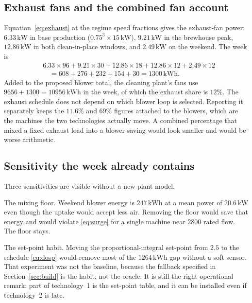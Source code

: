 \subsection{Exhaust fans and the combined fan account}

Equation~\eqref{eq:exhaust} at the regime speed fractions gives the exhaust-fan power: $6.33\,\mathrm{kW}$ in base production ($0.75^{3}\times 15\,\mathrm{kW}$), $9.21\,\mathrm{kW}$ in the brewhouse peak, $12.86\,\mathrm{kW}$ in both clean-in-place windows, and $2.49\,\mathrm{kW}$ on the weekend. The week is
\begin{equation}
\begin{aligned}
&6.33\times 96
+
9.21\times 30
+
12.86\times 18
+
12.86\times 12
+
2.49\times 12
\\
&\quad
=
608+276+232+154+30
=
1300\,\mathrm{kWh}.
\end{aligned}
\end{equation}
Added to the proposed blower total, the cleaning plant's fans use $9656+1300=10956\,\mathrm{kWh}$ in the week, of which the exhaust share is $12\%$. The exhaust schedule does not depend on which blower loop is selected. Reporting it separately keeps the $11.6\%$ and $69\%$ figures attached to the blowers, which are the machines the two technologies actually move. A combined percentage that mixed a fixed exhaust load into a blower saving would look smaller and would be worse arithmetic.

\subsection{Sensitivity the week already contains}

Three sensitivities are visible without a new plant model.

The mixing floor. Weekend blower energy is $247\,\mathrm{kWh}$ at a mean power of $20.6\,\mathrm{kW}$ even though the uptake would accept less air. Removing the floor would save that energy and would violate \eqref{eq:surge} for a single machine near \SI{2800}{\nmcph} rated flow. The floor stays.

The set-point habit. Moving the proportional-integral set-point from $2.5$ to the schedule \eqref{eq:dosp} would remove most of the $1264\,\mathrm{kWh}$ gap without a soft sensor. That experiment was not the baseline, because the fallback specified in Section~\ref{sec:build} is the habit, not the oracle. It is still the right operational remark: part of technology~1 is the set-point table, and it can be installed even if technology~2 is late.

